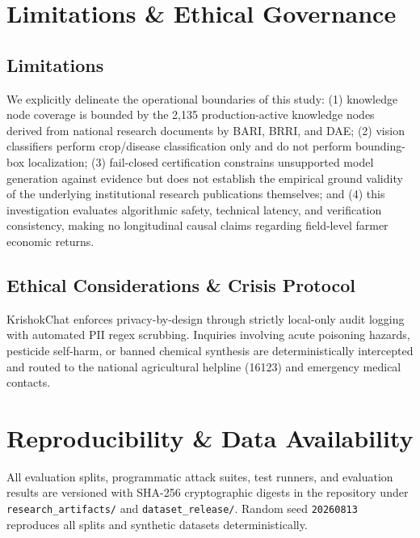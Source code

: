 \documentclass[11pt,a4paper]{article}
\begin{document}
\section{Limitations \& Ethical Governance}
\label{sec:limitations}

\subsection{Limitations}
We explicitly delineate the operational boundaries of this study: (1) knowledge node coverage is bounded by the 2,135 production-active knowledge nodes derived from national research documents by BARI, BRRI, and DAE; (2) vision classifiers perform crop/disease classification only and do not perform bounding-box localization; (3) fail-closed certification constrains unsupported model generation against evidence but does not establish the empirical ground validity of the underlying institutional research publications themselves; and (4) this investigation evaluates algorithmic safety, technical latency, and verification consistency, making no longitudinal causal claims regarding field-level farmer economic returns.

\subsection{Ethical Considerations \& Crisis Protocol}
KrishokChat enforces privacy-by-design through strictly local-only audit logging with automated PII regex scrubbing. Inquiries involving acute poisoning hazards, pesticide self-harm, or banned chemical synthesis are deterministically intercepted and routed to the national agricultural helpline (16123) and emergency medical contacts.


\section{Reproducibility \& Data Availability}
\label{sec:reproducibility}

All evaluation splits, programmatic attack suites, test runners, and evaluation results are versioned with SHA-256 cryptographic digests in the repository under \texttt{research\_artifacts/} and \texttt{dataset\_release/}. Random seed \texttt{20260813} reproduces all splits and synthetic datasets deterministically.
\end{document}

